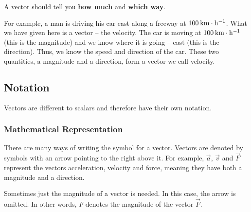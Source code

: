       \label{m38812*id186797}A vector should tell you \textbf{how much} and \textbf{which way}.\par 
      \label{m38812*id186810}For example, a man is driving his car east along a freeway at \begin{math}100\phantom{\rule{2pt}{0ex}}\mathrm{km}\ensuremath{\cdot}\mathrm{h}{}^{-1}\end{math}. What we have given here is a vector -- the velocity. The car is moving at \begin{math}100\phantom{\rule{2pt}{0ex}}\mathrm{km}\ensuremath{\cdot}\mathrm{h}{}^{-1}\end{math} (this is the magnitude) and we know where it is going -- east (this is the direction). Thus, we know the speed and direction of the car. These two quantities, a magnitude and a direction, form a vector we call velocity.\par 
    
    \label{m38812*cid4}
            \subsection{ Notation}
            \nopagebreak
            
      
      \label{m38812*id186874}Vectors are different to scalars and therefore have their own notation.\par 
      \label{m38812*uid1}
            \subsubsection{ Mathematical Representation}
            \nopagebreak
            
        
        \label{m38812*id186887}There are many ways of writing the symbol for a vector. Vectors are denoted by symbols with an arrow pointing to the right above it. For example, \begin{math}\stackrel{\to }{a}\end{math}, \begin{math}\stackrel{\to }{v}\end{math} and \begin{math}\stackrel{\to }{F}\end{math} represent the vectors acceleration, velocity and force, meaning they have both a magnitude and a direction.\par 
        \label{m38812*id186935}Sometimes just the magnitude of a vector is needed. In this case, the arrow is omitted. In other words, \begin{math}F\end{math} denotes the magnitude of the vector \begin{math}\stackrel{\to }{F}\end{math}. \par 
      
